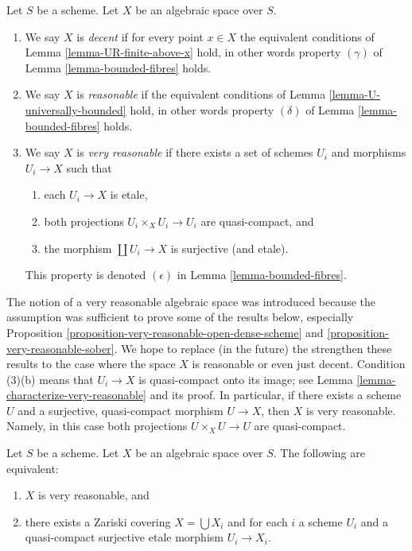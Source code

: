 \begin{definition}
\label{definition-very-reasonable}
Let $S$ be a scheme.
Let $X$ be an algebraic space over $S$.
\begin{enumerate}
\item We say $X$ is {\it decent} if for every point $x \in X$ the equivalent
conditions of Lemma \ref{lemma-UR-finite-above-x} hold, in other words
property $(\gamma)$ of
Lemma \ref{lemma-bounded-fibres}
holds.
\item We say $X$ is {\it reasonable} if the equivalent conditions of
Lemma \ref{lemma-U-universally-bounded}
hold, in other words property $(\delta)$ of
Lemma \ref{lemma-bounded-fibres}
holds.
\item We say $X$ is {\it very reasonable} if there exists a set of schemes
$U_i$ and morphisms $U_i \to X$ such that
\begin{enumerate}
\item each $U_i \to X$ is etale,
\item both projections $U_i \times_X U_i \to U_i$ are
quasi-compact, and
\item the morphism $\coprod U_i \to X$ is surjective (and etale).
\end{enumerate}
This property is denoted $(\epsilon)$ in
Lemma \ref{lemma-bounded-fibres}.
\end{enumerate}
\end{definition}

\noindent
The notion of a very reasonable algebraic space was introduced because
the assumption was sufficient to prove some of the results below, especially
Proposition \ref{proposition-very-reasonable-open-dense-scheme} and
\ref{proposition-very-reasonable-sober}.
We hope to replace (in the future) the strengthen these results to
the case where the space $X$ is reasonable or even just decent.
Condition (3)(b) means that $U_i \to X$ is quasi-compact onto its image;
see Lemma \ref{lemma-characterize-very-reasonable} and its proof.
In particular, if there exists a scheme $U$ and a surjective, quasi-compact
morphism $U \to X$, then $X$ is very reasonable. Namely, in this case both
projections $U \times_X U \to U$ are quasi-compact.

\begin{lemma}
\label{lemma-characterize-very-reasonable}
Let $S$ be a scheme.
Let $X$ be an algebraic space over $S$.
The following are equivalent:
\begin{enumerate}
\item $X$ is very reasonable, and
\item there exists a Zariski covering $X = \bigcup X_i$ and for
each $i$ a scheme $U_i$ and a quasi-compact surjective etale
morphism $U_i \to X_i$.
\end{enumerate}
\end{lemma}


